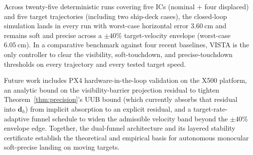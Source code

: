 \documentclass{IEEEtaes}
\theoremstyle{definition}
\theoremstyle{remark}
\begin{document}
Across twenty-five deterministic runs covering five ICs (nominal $+$ four displaced) and five target trajectories (including two ship-deck cases), the closed-loop simulation lands in every run with worst-case horizontal error $3.60~\text{cm}$ and remains soft and precise across a $\pm 40\%$ target-velocity envelope (worst-case $6.05~\text{cm}$). In a comparative benchmark against four recent baselines, VISTA is the only controller to clear the visibility, soft-touchdown, and precise-touchdown thresholds on every trajectory and every tested target speed.

Future work includes PX4 hardware-in-the-loop validation on the X500 platform, an analytic bound on the visibility-barrier projection residual to tighten Theorem~\ref{thm:precision}'s UUB bound (which currently absorbs that residual into $\boldsymbol{d}_h$) from implicit absorption to an explicit residual, and a target-rate-adaptive funnel schedule to widen the admissible velocity band beyond the $\pm 40\%$ envelope edge. Together, the dual-funnel architecture and its layered stability certificate establish the theoretical and empirical basis for autonomous monocular soft-precise landing on moving targets.

\appendices
\end{document}
